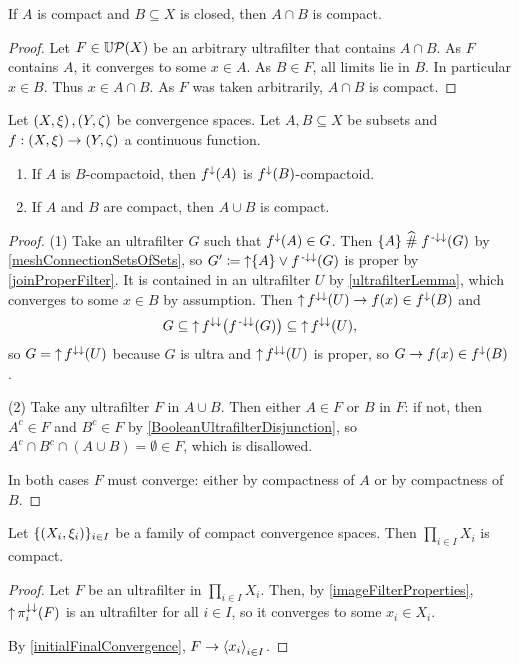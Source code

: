 \begin{proposition} \label{compactClosedIntersectionCompact}
If $A$ is compact and $B\subseteq X$ is closed, then $A\cap B$ is compact.
\end{proposition}
\begin{proof}
Let $F\in \operatorname{\mathbb{U}\mathcal{P}}(X)$ be an arbitrary ultrafilter that contains $A\cap B$. As $F$ contains $A$, it converges to some $x\in A$. As $B\in F$, all limits lie in $B$. In particular $x\in B$. Thus $x\in A\cap B$. As $F$ was taken arbitrarily, $A\cap B$ is compact.
\end{proof}

\begin{proposition} \label{compactConstructions}
Let $\left( X,\xi \right), \left( Y,\zeta \right)$ be convergence spaces. Let $A,B\subseteq X$ be subsets and $f: \left( X,\xi \right)\to \left( Y,\zeta \right)$ a continuous function.
\begin{enumerate}
\item If $A$ is $B$-compactoid, then $f^\downarrow(A)$ is $f^\downarrow(B)$-compactoid.
\item If $A$ and $B$ are compact, then $A\cup B$ is compact.
\end{enumerate}
\end{proposition}
\begin{proof}
(1) Take an ultrafilter $G$ such that $f^{\downarrow}(A)\in G$. Then $\{A\}\mathrel{\widehat{\#}} f^{{\text{\hspace{0.15em}-}\downarrow}\downarrow}(G)$ by \ref{meshConnectionSetsOfSets}, so $G' \coloneqq \operatorname{\uparrow}\{A\}\vee f^{{\text{\hspace{0.15em}-}\downarrow}\downarrow}(G)$ is proper by \ref{joinProperFilter}. It is contained in an ultrafilter $U$ by \ref{ultrafilterLemma}, which converges to some $x\in B$ by assumption. Then $\operatorname{\uparrow} f^{\downarrow\downarrow}(U) \to f(x)\in f^\downarrow(B)$ and
\[ G \subseteq \operatorname{\uparrow} f^{\downarrow\downarrow}\big(f^{{\text{\hspace{0.15em}-}\downarrow}\downarrow}(G)\big) \subseteq \operatorname{\uparrow} f^{\downarrow\downarrow}(U), \]
so $G = \operatorname{\uparrow} f^{\downarrow\downarrow}(U)$ because $G$ is ultra and $\operatorname{\uparrow} f^{\downarrow\downarrow}(U)$ is proper, so $G\to f(x)\in f^\downarrow(B)$.

(2) Take any ultrafilter $F$ in $A\cup B$. Then either $A\in F$ or $B$ in $F$: if not, then $A^c\in F$ and $B^c \in F$ by \ref{BooleanUltrafilterDisjunction}, so $A^c\cap B^c\cap (A\cup B) = \emptyset \in F$, which is disallowed.

In both cases $F$ must converge: either by compactness of $A$ or by compactness of $B$.
\end{proof}

\begin{theorem}[Tychonoff] \label{TychonoffsTheorem}
Let $\{\left( X_i, \xi_i \right)\}_{i\in I}$ be a family of compact convergence spaces. Then $\prod_{i\in I}X_i$ is compact.
\end{theorem}
\begin{proof}
Let $F$ be an ultrafilter in $\prod_{i\in I}X_i$. Then, by \ref{imageFilterProperties}, $\operatorname{\uparrow} \pi_i^{\downarrow\downarrow}(F)$ is an ultrafilter for all $i\in I$, so it converges to some $x_i\in X_i$.

By \ref{initialFinalConvergence}, $F\to \left\langle x_i \right\rangle_{i\in I}$.
\end{proof}

